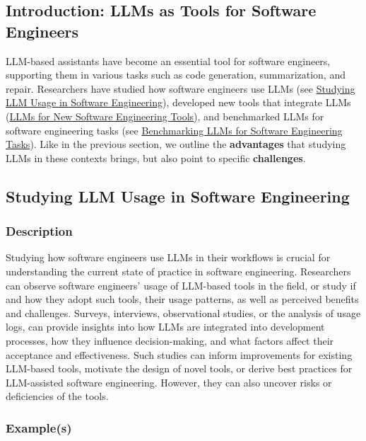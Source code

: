 \subsection{Introduction: LLMs as Tools for Software Engineers}

LLM-based assistants have become an essential tool for software engineers, supporting them in various tasks such as code generation, summarization, and repair.
Researchers have studied how software engineers use LLMs (see \href{/study-types/#studying-llm-usage-in-software-engineering}{Studying LLM Usage in Software Engineering}), developed new tools that integrate LLMs (\href{/study-types/#llms-for-new-software-engineering-tools}{LLMs for New Software Engineering Tools}), and benchmarked LLMs for software engineering tasks  (see \href{/study-types/#benchmarking-llms-for-software-engineering-tasks}{Benchmarking LLMs for Software Engineering Tasks}).
Like in the previous section, we outline the \textbf{advantages} that studying LLMs in these contexts brings, but also point to specific \textbf{challenges}.
\subsection{Studying LLM Usage in Software Engineering}

\subsubsection{Description}

Studying how software engineers use LLMs in their workflows is crucial for understanding the current state of practice in software engineering.
Researchers can observe software engineers' usage of LLM-based tools in the field, or study if and how they adopt such tools, their usage patterns, as well as perceived benefits and challenges.
Surveys, interviews, observational studies, or the analysis of usage logs, can provide insights into how LLMs are integrated into development processes, how they influence decision-making, and what factors affect their acceptance and effectiveness. 
Such studies can inform improvements for existing LLM-based tools, motivate the design of novel tools, or derive best practices for LLM-assisted software engineering.
However, they can also uncover risks or deficiencies of the tools.

\subsubsection{Example(s)}

